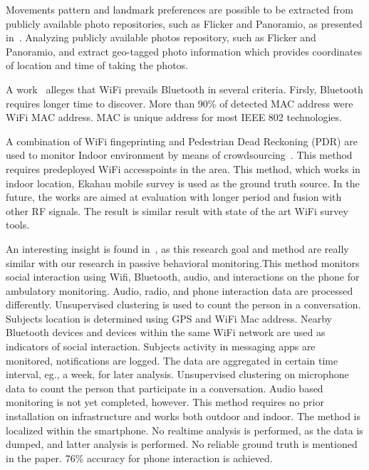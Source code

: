\documentclass{article}
\begin{document}
Movements pattern and landmark preferences are possible to be extracted from publicly available photo repositories, such as Flicker and Panoramio, as presented in~\cite{thesis026}. Analyzing publicly available photos repository, such as Flicker and Panoramio, and extract geo-tagged photo information which provides coordinates of location and time of taking the photos.

A work~\cite{thesis009} alleges that WiFi prevails Bluetooth in several criteria. Firsly, Bluetooth requires longer time to discover. More than 90\% of detected MAC address were WiFi MAC address. MAC is unique address for most IEEE 802 technologies.


A combination of WiFi fingeprinting and Pedestrian Dead Reckoning (PDR) are used to monitor Indoor environment by means of crowdsourcing~\cite{thesis020}. This method requires predeployed WiFi accesspoints in the area. This method, which works in indoor location, Ekahau mobile survey is used as the ground truth source. In the future, the works are aimed at evaluation with longer period and fusion with other RF signals. The result is similar result with state of the art WiFi survey tools.


An interesting insight is found in~\cite{thesis031}, as this research goal and method are really similar with our research in passive behavioral monitoring.This method monitors social interaction using Wifi, Bluetooth, audio, and interactions on the phone for ambulatory monitoring. Audio, radio, and phone interaction data are processed differently. Unsupervised clustering is used to count the person in a conversation. Subjects location is determined using GPS and WiFi Mac address. Nearby Bluetooth devices and devices within the same WiFi network are used as indicators of social interaction. Subjects activity in messaging apps are monitored, notifications are logged. The data are aggregated in certain time interval, eg., a week, for later analysis. Unsupervised clustering on microphone data to count the person that participate in a conversation. Audio based monitoring is not yet completed, however. This method requires no prior installation on infrastructure and works both outdoor and indoor. The method is localized within the smartphone. No realtime analysis is performed, as the data is dumped, and latter analysis is performed. No reliable ground truth is mentioned in the paper. 76\% accuracy for phone interaction is achieved.
\end{document}
